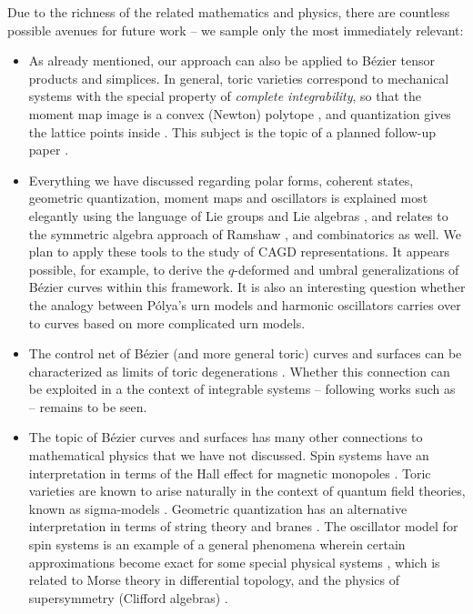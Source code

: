\documentclass[final,3p,mathptmx]{elsarticle}
\begin{document}
Due to the richness of the related mathematics and physics, there are countless possible avenues for future work -- we sample only the most immediately relevant:
\begin{itemize}
	\item As already mentioned, our approach can also be applied to B\'{e}zier tensor products and simplices. In general, toric varieties correspond to mechanical systems with the special property of \emph{complete integrability}, so that the moment map image is a convex (Newton) polytope \cite{atiyah1983angular,delzant1988hamiltoniens}, and quantization gives the lattice points inside \cite{vergne1996convex,hamilton2007quantization}. This subject is the topic of a planned follow-up paper \cite{vaitkus2018surface}.
	\item Everything we have discussed regarding polar forms, coherent states, geometric quantization, moment maps and oscillators is explained most elegantly using the language of Lie groups and Lie algebras \cite{singer2006linearity,sattinger1986lie,fulton1991representation}, and relates to the symmetric algebra approach of Ramshaw \cite{ramshaw2001paired}, and  combinatorics \cite{blasiak2011combinatorial} as well. We plan to apply these tools to the study of CAGD representations. It appears possible, for example, to derive the $q$-deformed \cite{goldman2015quantum} and umbral \cite{winkel2014generalization} generalizations of B\'{e}zier curves within this framework. It is also an interesting question whether the analogy between P\'{o}lya's urn models and harmonic oscillators carries over to curves based on more complicated urn models.
	\item The control net of B\'{e}zier (and more general toric) curves and surfaces can be characterized as limits of toric degenerations \cite{garc2011toric}. Whether this connection can be exploited in a the context of integrable systems -- following works such as \cite{harada2015integrable} -- remains to be seen. 
	\item The topic of B\'{e}zier curves and surfaces has many other connections to mathematical physics that we have not discussed. Spin systems have an interpretation in terms of the Hall effect for magnetic monopoles \cite{hasebe2013topological}. Toric varieties are known to arise naturally in the context of quantum field theories, known as sigma-models \cite{witten1993phases,hori2003mirror}. Geometric quantization has an alternative interpretation in terms of string theory and branes \cite{gukov2008branes}. The oscillator model for spin systems is an example of a general phenomena wherein certain approximations become exact for some special physical systems \cite{szabo2003equivariant}, which is related to Morse theory in differential topology, and the physics of supersymmetry (Clifford algebras) \cite{witten1982supersymmetry,stone1989supersymmetry} .

\end{itemize}
\end{document}
